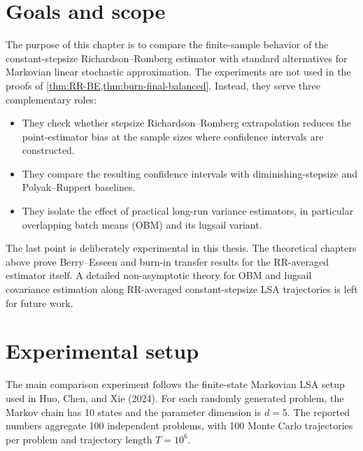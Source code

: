 \section{Goals and scope}

The purpose of this chapter is to compare the finite-sample behavior of the
constant-stepsize Richardson--Romberg estimator with standard alternatives
for Markovian linear stochastic approximation. The experiments are not used
in the proofs of \cref{thm:RR-BE,thm:burn-final-balanced}. Instead, they serve
three complementary roles:

\begin{itemize}
\item They check whether stepsize Richardson--Romberg extrapolation reduces the
  point-estimator bias at the sample sizes where confidence intervals are
  constructed.
\item They compare the resulting confidence intervals with diminishing-stepsize
  and Polyak--Ruppert baselines.
\item They isolate the effect of practical long-run variance estimators, in
  particular overlapping batch means (OBM) and its lugsail variant.
\end{itemize}

The last point is deliberately experimental in this thesis. The theoretical
chapters above prove Berry--Esseen and burn-in transfer results for the
RR-averaged estimator itself. A detailed non-asymptotic theory for OBM and
lugsail covariance estimation along RR-averaged constant-stepsize LSA
trajectories is left for future work.

\section{Experimental setup}

The main comparison experiment follows the finite-state Markovian LSA setup
used in Huo, Chen, and Xie (2024). For each randomly generated problem, the
Markov chain has 10 states and the parameter dimension is $d=5$. The reported
numbers aggregate 100 independent problems, with 100 Monte Carlo trajectories
per problem and trajectory length $T=10^6$.

